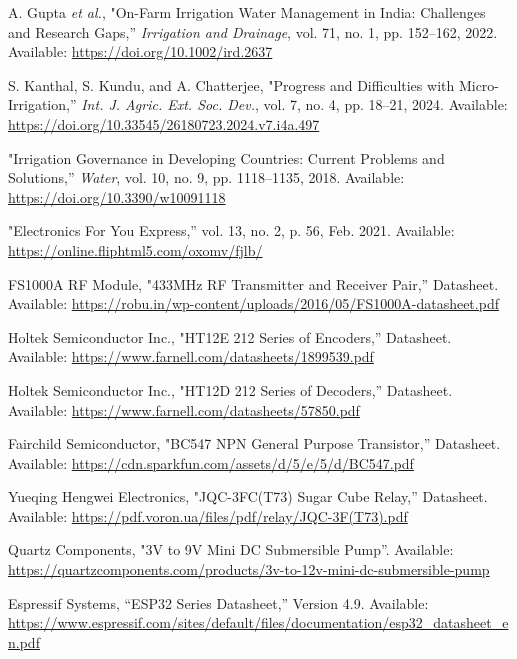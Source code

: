{}
\renewcommand{\bibname}{References}
\begin{thebibliography}{9}

  \label{gupta2022}
  A. Gupta \textit{et al.}, "On-Farm Irrigation Water Management in India: Challenges and Research Gaps,” \textit{Irrigation and Drainage}, vol. 71, no. 1, pp. 152–162, 2022. Available: \url{https://doi.org/10.1002/ird.2637}

  \label{kanthal2024}
  S. Kanthal, S. Kundu, and A. Chatterjee, "Progress and Difficulties with Micro-Irrigation,” \textit{Int. J. Agric. Ext. Soc. Dev.}, vol. 7, no. 4, pp. 18–21, 2024. Available: \url{https://doi.org/10.33545/26180723.2024.v7.i4a.497}

  \label{water2018}
  "Irrigation Governance in Developing Countries: Current Problems and Solutions,” \textit{Water}, vol. 10, no. 9, pp. 1118–1135, 2018. Available: \url{https://doi.org/10.3390/w10091118}

  \label{efy}
  "Electronics For You Express,” vol. 13, no. 2, p. 56, Feb. 2021. Available: \url{https://online.fliphtml5.com/oxomv/fjlb/}

  \label{fs1000a}
  FS1000A RF Module, "433MHz RF Transmitter and Receiver Pair,” Datasheet. Available: \url{https://robu.in/wp-content/uploads/2016/05/FS1000A-datasheet.pdf}

  \label{ht12e}
  Holtek Semiconductor Inc., "HT12E 212 Series of Encoders,” Datasheet. Available: \url{https://www.farnell.com/datasheets/1899539.pdf}

  \label{ht12d}
  Holtek Semiconductor Inc., "HT12D 212 Series of Decoders,” Datasheet. Available: \url{https://www.farnell.com/datasheets/57850.pdf}

  \label{bc547}
  Fairchild Semiconductor, "BC547 NPN General Purpose Transistor,” Datasheet. Available: \url{https://cdn.sparkfun.com/assets/d/5/e/5/d/BC547.pdf}

  \label{jqc}
  Yueqing Hengwei Electronics, "JQC-3FC(T73) Sugar Cube Relay,” Datasheet. Available: \url{https://pdf.voron.ua/files/pdf/relay/JQC-3F(T73).pdf}
  
	\label{pump}
  Quartz Components, "3V to 9V Mini DC Submersible Pump”. Available: \url{https://quartzcomponents.com/products/3v-to-12v-mini-dc-submersible-pump}
	
	\label{esp32}
  Espressif Systems, “ESP32 Series Datasheet,” Version 4.9. Available: \url{https://www.espressif.com/sites/default/files/documentation/esp32_datasheet_en.pdf}

\end{thebibliography}

